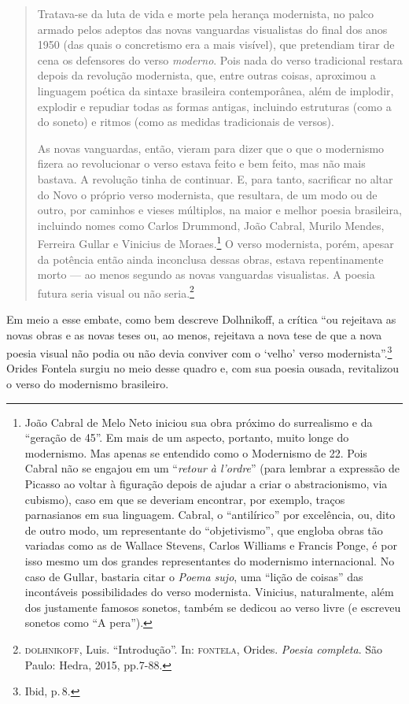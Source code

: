 \begin{quote}
Tratava-se da luta de vida e morte pela herança modernista, no palco
armado pelos adeptos das novas vanguardas visualistas do ﬁnal dos anos
1950 (das quais o concretismo era a mais visível), que pretendiam tirar
de cena os defensores do verso \emph{moderno}. Pois nada do verso
tradicional restara depois da revolução modernista, que, entre outras
coisas, aproximou a linguagem poética da sintaxe brasileira
contemporânea, além de implodir, explodir e repudiar todas as formas
antigas, incluindo estruturas (como a do soneto) e ritmos (como as
medidas tradicionais de versos).

As novas vanguardas, então, vieram para
dizer que o que o modernismo ﬁzera ao revolucionar o verso estava
feito e bem feito, mas não mais bastava. A revolução tinha de continuar.
E, para tanto, sacriﬁcar no altar do Novo o próprio verso modernista,
que resultara, de um modo ou de outro, por caminhos e vieses
múltiplos, na maior e melhor poesia brasileira, incluindo nomes como
Carlos Drummond, João Cabral, Murilo Mendes, Ferreira Gullar e Vinicius
de Moraes.\footnote{João Cabral de Melo Neto iniciou sua obra próximo do surrealismo e da ``geração de 45''. Em mais de um aspecto, portanto, muito longe do modernismo. Mas
apenas se entendido como o Modernismo de 22. Pois Cabral não se
engajou em um ``\emph{retour à l'ordre}'' (para lembrar a expressão de
Picasso ao voltar à ﬁguração depois de ajudar a criar o abstracionismo, via cubismo), caso em que se deveriam encontrar, por exemplo,
traços parnasianos em sua linguagem. Cabral, o ``antilírico'' por
excelência, ou, dito de outro modo, um representante do
``objetivismo'', que engloba obras tão variadas como as de Wallace
Stevens, Carlos Williams e Francis Ponge, é por isso mesmo um dos
grandes representantes do modernismo internacional. No caso de Gullar,
bastaria citar o \emph{Poema sujo}, uma ``lição de coisas'' das
incontáveis possibilidades do verso modernista. Vinicius, naturalmente,
além dos justamente famosos sonetos, também se dedicou ao verso livre (e
escreveu sonetos como ``A pera'').} O verso modernista, porém, apesar da potência então ainda inconclusa dessas obras, estava repentinamente morto --- ao menos
segundo as novas vanguardas visualistas. A poesia
futura seria visual ou não seria.\footnote{\textsc{dolhnikoff}, Luis. ``Introdução''. In: \textsc{fontela}, Orides. \emph{Poesia completa}. São Paulo: Hedra, 2015, pp.7-88.}
\end{quote}

Em meio a esse embate, como bem descreve Dolhnikoff, a crítica ``ou rejeitava as novas obras e as novas teses ou, ao menos, rejeitava a nova tese de que a nova poesia visual não podia ou não devia conviver com o `velho' verso modernista''.\footnote{Ibid, p.\,8.} Orides Fontela surgiu no meio desse quadro e, com sua poesia ousada, revitalizou o verso do modernismo brasileiro. 

